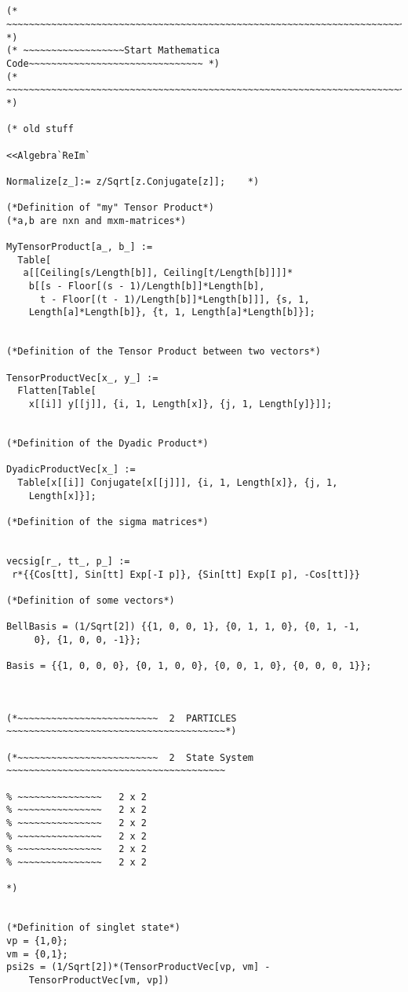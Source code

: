 \documentclass[%
  twocolumn,
 showpacs,
 showkeys,
 preprintnumbers,
 amsmath,amssymb,
 aps,
  pra,
  longbibliography,
 floatfix,
 ]{revtex4-1}
\begin{document}
{ \begin{lstlisting}[backgroundcolor=\color{yellow!10},framerule=0pt,breaklines=true, frame=tb]


(* ~~~~~~~~~~~~~~~~~~~~~~~~~~~~~~~~~~~~~~~~~~~~~~~~~~~~~~~~~~~~~~~~~~~~~~~ *)
(* ~~~~~~~~~~~~~~~~~~Start Mathematica Code~~~~~~~~~~~~~~~~~~~~~~~~~~~~~~~ *)
(* ~~~~~~~~~~~~~~~~~~~~~~~~~~~~~~~~~~~~~~~~~~~~~~~~~~~~~~~~~~~~~~~~~~~~~~~ *)

(* old stuff

<<Algebra`ReIm`

Normalize[z_]:= z/Sqrt[z.Conjugate[z]];    *)

(*Definition of "my" Tensor Product*)
(*a,b are nxn and mxm-matrices*)

MyTensorProduct[a_, b_] :=
  Table[
   a[[Ceiling[s/Length[b]], Ceiling[t/Length[b]]]]*
    b[[s - Floor[(s - 1)/Length[b]]*Length[b],
      t - Floor[(t - 1)/Length[b]]*Length[b]]], {s, 1,
    Length[a]*Length[b]}, {t, 1, Length[a]*Length[b]}];


(*Definition of the Tensor Product between two vectors*)

TensorProductVec[x_, y_] :=
  Flatten[Table[
    x[[i]] y[[j]], {i, 1, Length[x]}, {j, 1, Length[y]}]];


(*Definition of the Dyadic Product*)

DyadicProductVec[x_] :=
  Table[x[[i]] Conjugate[x[[j]]], {i, 1, Length[x]}, {j, 1,
    Length[x]}];

(*Definition of the sigma matrices*)


vecsig[r_, tt_, p_] :=
 r*{{Cos[tt], Sin[tt] Exp[-I p]}, {Sin[tt] Exp[I p], -Cos[tt]}}

(*Definition of some vectors*)

BellBasis = (1/Sqrt[2]) {{1, 0, 0, 1}, {0, 1, 1, 0}, {0, 1, -1,
     0}, {1, 0, 0, -1}};

Basis = {{1, 0, 0, 0}, {0, 1, 0, 0}, {0, 0, 1, 0}, {0, 0, 0, 1}};



(*~~~~~~~~~~~~~~~~~~~~~~~~~  2  PARTICLES ~~~~~~~~~~~~~~~~~~~~~~~~~~~~~~~~~~~~~~~*)

(*~~~~~~~~~~~~~~~~~~~~~~~~~  2  State System ~~~~~~~~~~~~~~~~~~~~~~~~~~~~~~~~~~~~~~~

% ~~~~~~~~~~~~~~~   2 x 2
% ~~~~~~~~~~~~~~~   2 x 2
% ~~~~~~~~~~~~~~~   2 x 2
% ~~~~~~~~~~~~~~~   2 x 2
% ~~~~~~~~~~~~~~~   2 x 2
% ~~~~~~~~~~~~~~~   2 x 2

*)


(*Definition of singlet state*)
vp = {1,0};
vm = {0,1};
psi2s = (1/Sqrt[2])*(TensorProductVec[vp, vm] -
    TensorProductVec[vm, vp])


\end{lstlisting}}
\end{document}
